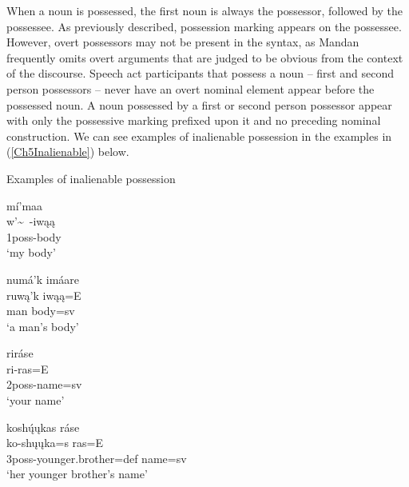 When a noun is possessed, the first noun is always the possessor, followed by the possessee. As previously described, possession marking appears on the possessee. However, overt possessors may not be present in the syntax, as Mandan frequently omits overt arguments that are judged to be obvious from the context of the discourse. Speech act participants that possess a noun -- first and second person possessors -- never have an overt nominal element appear before the possessed noun. A noun possessed by a first or second person possessor appear with only the possessive marking prefixed upon it and no preceding nominal construction. We can see examples of inalienable possession in the examples in (\ref{Ch5Inalienable}) below.

\begin{exe}
    \item\label{Ch5Inalienable} Examples of inalienable possession

    \begin{xlist}
        \item\label{Ch5InalienableA} \glll mí'maa\\
        w'\~~-iwąą\\
        1poss-\textnormal{body}\\
        \glt `my body' \citep[96]{hollow1970}

        \item\label{Ch5InalienableB} \glll numá'k imáare\\
        ruwą’k iwąą=E\\
        \textnormal{man} \textnormal{body}=sv\\
        \glt `a man's body' \citep[202]{hollow1973b}

        \item\label{Ch5InalienableC} \glll riráse\\
        ri-ras=E\\
        2poss-\textnormal{name}=sv\\
        \glt `your name' \citep[14]{hollow1973a}

        \item \glll koshų́ųkas ráse\\
        ko-shųųka=s ras=E\\
        3poss-\textnormal{younger.brother}=def \textnormal{name}=sv\\
        \glt `her younger brother's name' \citep[285]{hollow1973b}

    \end{xlist}
\end{exe}

